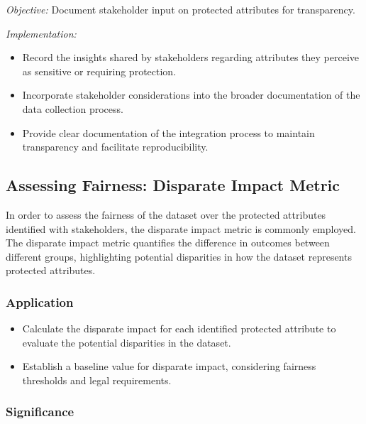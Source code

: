 \documentclass[12pt,a4paper,openright,twoside]{book}
\begin{document}
\emph{Objective:} Document stakeholder input on protected attributes for transparency.

\emph{Implementation:}

\begin{itemize}

    \item Record the insights shared by stakeholders regarding attributes they perceive as sensitive or requiring protection.

    \item Incorporate stakeholder considerations into the broader documentation of the data collection process.

    \item Provide clear documentation of the integration process to maintain transparency and facilitate reproducibility.

\end{itemize}

\subsection{Assessing Fairness: Disparate Impact Metric}

In order to assess the fairness of the dataset over the protected attributes identified with stakeholders, the disparate impact metric is commonly employed. The disparate impact metric quantifies the difference in outcomes between different groups, highlighting potential disparities in how the dataset represents protected attributes.

\subsubsection{Application}

\begin{itemize}
    
    \item Calculate the disparate impact for each identified protected attribute to evaluate the potential disparities in the dataset.
    
    \item Establish a baseline value for disparate impact, considering fairness thresholds and legal requirements.

\end{itemize}

\subsubsection{Significance}
\end{document}
